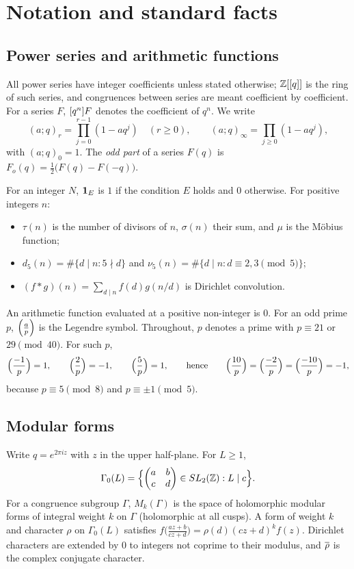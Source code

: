 \section{Notation and standard facts}\label{sec:notation}

\subsection{Power series and arithmetic functions}
All power series have integer coefficients unless stated otherwise; $\mathbb{Z}[[q]]$ is the
ring of such series, and congruences between series are meant coefficient by
coefficient. For a series $F$, $[q^{n}]F$ denotes the coefficient of $q^n$. We
write
\[
  (a;q)_r=\prod_{j=0}^{r-1}(1-aq^j)\quad(r\ge0),\qquad
  (a;q)_\infty=\prod_{j\ge0}(1-aq^j),
\]
with $(a;q)_0=1$. The \emph{odd part} of a series $F(q)$ is
$F_o(q)=\tfrac12\bigl(F(q)-F(-q)\bigr)$.

For an integer $N$, $\mathbf 1_E$ is $1$ if the condition $E$ holds and $0$
otherwise. For positive integers $n$:
\begin{itemize}[leftmargin=2em]
\item $\tau(n)$ is the number of divisors of $n$, $\sigma(n)$ their sum, and
  $\mu$ is the M\"obius function;
\item $d_5(n)=\#\{d\mid n:5\nmid d\}$ and
  $\nu_5(n)=\#\{d\mid n:d\equiv2,3\pmod5\}$;
\item $(f*g)(n)=\sum_{d\mid n}f(d)g(n/d)$ is Dirichlet convolution.
\end{itemize}
An arithmetic function evaluated at a positive non-integer is $0$. For an odd
prime $p$, $\Bigl(\frac{a}{p}\Bigr)$ is the Legendre symbol. Throughout, $p$ denotes a prime with
$p\equiv21$ or $29\pmod{40}$. For such $p$,
\begin{equation}\label{eq:legendre-values}
  \Bigl(\frac{-1}{p}\Bigr)=1,\qquad \Bigl(\frac{2}{p}\Bigr)=-1,\qquad \Bigl(\frac{5}{p}\Bigr)=1,\qquad\text{hence}\qquad
  \Bigl(\frac{10}{p}\Bigr)=\Bigl(\frac{-2}{p}\Bigr)=\Bigl(\frac{-10}{p}\Bigr)=-1 ,
\end{equation}
because $p\equiv5\pmod8$ and $p\equiv\pm1\pmod5$.

\subsection{Modular forms}
Write $q=e^{2\pi iz}$ with $z$ in the upper half-plane. For $L\ge1$,
\[
  \Gamma_0(L)=\Bigl\{\begin{pmatrix}a&b\\c&d\end{pmatrix}\in SL_2(\mathbb{Z}):L\mid c\Bigr\}.
\]
For a congruence subgroup $\Gamma$, $M_k(\Gamma)$ is the space of holomorphic
modular forms of integral weight $k$ on $\Gamma$ (holomorphic at all cusps). A
form of weight $k$ and character $\rho$ on $\Gamma_0(L)$ satisfies
$f\bigl(\frac{az+b}{cz+d}\bigr)=\rho(d)(cz+d)^kf(z)$. Dirichlet characters are
extended by $0$ to integers not coprime to their modulus, and $\overline\rho$ is the
complex conjugate character.

